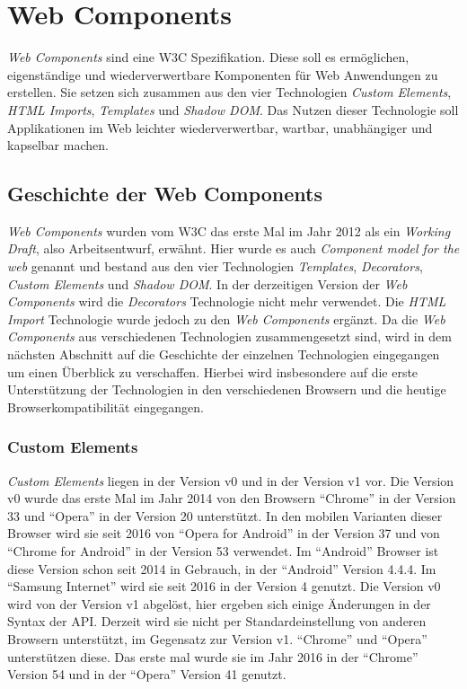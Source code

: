 \documentclass[12pt, paper=a4, bibtotoc, toc=listof, headsepline=true, numbers=endperiod]{scrreprt}
\begin{document}
\chapter{Web Components}
	\emph{Web Components} sind eine \ac{W3C} Spezifikation. Diese soll es ermöglichen, eigenständige und wiederverwertbare Komponenten für Web Anwendungen zu erstellen\cite[S. 1]{patel2015learning}. Sie setzen sich zusammen aus den vier Technologien \emph{Custom Elements}, \emph{\ac{HTML} Imports}, \emph{Templates} und \emph{Shadow \ac{DOM}}. Das Nutzen dieser Technologie soll Applikationen im Web leichter wiederverwertbar, wartbar, unabhängiger und kapselbar machen\cite[S.2]{patel2015learning}.
	\section{Geschichte der Web Components}
	\label{ref:gesVonWebCom}
	\emph{Web Components} wurden vom \ac{W3C} das erste Mal im Jahr 2012 als ein \emph{Working Draft}, also Arbeitsentwurf, erwähnt. Hier wurde es auch \emph{Component model for the web} genannt und bestand aus den vier Technologien \emph{Templates}, \emph{Decorators}, \emph{Custom Elements} und \emph{Shadow DOM}. In der derzeitigen Version der \emph{Web Components} wird die \emph{Decorators} Technologie nicht mehr verwendet. Die \emph{\ac{HTML} Import} Technologie wurde jedoch zu den \emph{Web Components} ergänzt\cite{Cooney2012}. Da die \emph{Web Components} aus verschiedenen Technologien zusammengesetzt sind, wird in dem nächsten Abschnitt auf die Geschichte der einzelnen Technologien eingegangen um einen Überblick zu verschaffen. Hierbei wird insbesondere auf die erste Unterstützung der Technologien in den verschiedenen Browsern und die heutige Browserkompatibilität eingegangen.
		\subsection{Custom Elements}
		\emph{Custom Elements} liegen in der Version v0 und in der Version v1 vor. Die Version v0 wurde das erste Mal im Jahr 2014 von den Browsern \enquote{Chrome} in der Version 33 und \enquote{Opera} in der Version 20 unterstützt. In den mobilen Varianten dieser Browser  wird sie seit 2016 von \enquote{Opera for Android} in der Version 37 und von \enquote{Chrome for Android} in der Version 53 verwendet\cite{C2015}. Im \enquote{Android} Browser ist diese Version schon seit 2014 in Gebrauch, in der \enquote{Android} Version 4.4.4. Im \enquote{Samsung Internet} wird sie seit 2016 in der Version 4 genutzt\cite{cusEleCanIUse}. Die Version v0 wird von der Version v1 abgelöst, hier ergeben sich einige Änderungen in der Syntax der \ac{API}\cite{Bidelman2016cusElev1}. Derzeit wird sie nicht per Standardeinstellung von anderen Browsern unterstützt\cite{firefox}, im Gegensatz zur Version v1. \enquote{Chrome} und \enquote{Opera} unterstützen diese. Das erste mal wurde sie im Jahr 2016 in der \enquote{Chrome} Version 54 und in der \enquote{Opera} Version 41 genutzt\cite{C2016}.
\end{document}
